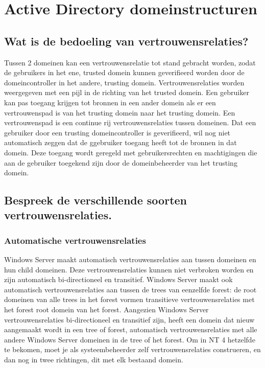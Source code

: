 \chapter{Active Directory domeinstructuren}

\section{Wat is de bedoeling van vertrouwensrelaties?}

Tussen 2 domeinen kan een vertrouwensrelatie tot stand gebracht worden, zodat de
gebruikers in het ene, trusted domein kunnen geverifieerd worden door de
domeincontroller in het andere, trusting domein. Vertrouwensrelaties worden
weergegeven met een pijl in de richting van het trusted domein. Een gebruiker
kan pas toegang krijgen tot bronnen in een ander domein als er een
vertrouwenspad is van het trusting domein naar het trusting domein. Een
vertrouwenspad is een continue rij vertrouwensrelaties tussen domeinen. Dat een
gebruiker door een trusting domeincontroller is geverifieerd, wil nog niet
automatisch zeggen dat de ggebruiker toegang heeft tot de bronnen in dat domein.
Deze toegang wordt geregeld met gebruikersrechten en machtigingen die aan de
gebruiker toegekend zijn door de domeinbeheerder van het trusting domein.

\section{Bespreek de verschillende soorten vertrouwensrelaties.}

\subsection{Automatische vertrouwensrelaties}

Windows Server maakt automatisch vertrouwensrelaties aan tussen domeinen en hun
child domeinen. Deze vertrouwensrelaties kunnen niet verbroken worden en zijn
automatisch bi-directioneel en transitief. Windows Server maakt ook automatisch
vertrouwensrelaties aan tussen de trees van eenzelfde forest: de root domeinen
van alle trees in het forest vormen transitieve vertrouwensrelaties met het
forest root domein van het forest.
Aangezien Windows Server vertrouwensrelaties bi-directioneel en transitief zijn,
heeft een domein dat nieuw aangemaakt wordt in een tree of forest, automatisch
vertrouwensrelaties met alle andere Windows Server domeinen in de tree of het
forest.
Om in NT 4 hetzelfde te bekomen, moet je als systeembeheerder zelf
vertrouwensrelaties construeren, en dan nog in twee richtingen, dit met elk
bestaand domein.

